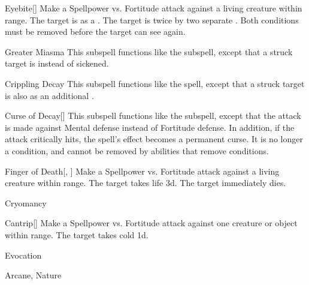 \begin{ability}[\nth{4}]{Eyebite}[]
Make a Spellpower vs. Fortitude attack against a living creature within \rngclose range.
\hit The target is  as a .
\crit The target is  twice by two separate .
Both conditions must be removed before the target can see again.
\end{ability}
\vspace{0.25em}


\begin{ability}[\nth{4}]{Greater Miasma}
This subspell functions like the  subspell, except that a struck target is  instead of sickened.
\end{ability}
\vspace{0.25em}


\begin{ability}[\nth{5}]{Crippling Decay}
This subspell functions like the  spell, except that a struck target is also  as an additional .
\end{ability}
\vspace{0.25em}


\begin{ability}[\nth{6}]{Curse of Decay}[]
This subspell functions like the  subspell, except that the attack is made against Mental defense instead of Fortitude defense.
In addition, if the attack critically hits, the spell's effect becomes a permanent curse.
It is no longer a condition, and cannot be removed by abilities that remove conditions.
\end{ability}
\vspace{0.25em}


\begin{ability}[\nth{7}]{Finger of Death}[, ]
Make a Spellpower vs. Fortitude attack against a living creature within \rngclose range.
\hit The target takes life  \plus3d.
\crit The target immediately dies.
\end{ability}
\vspace{0.25em}

\newpage
\begin{spellsection}{Cryomancy}

\begin{spellheader}
\end{spellheader}


\begin{ability}{Cantrip}[]
Make a Spellpower vs. Fortitude attack against one creature or object within \rngmed range.
\hit The target takes cold  \minus1d.
\end{ability}




 Evocation

 Arcane, Nature
\end{spellsection}


